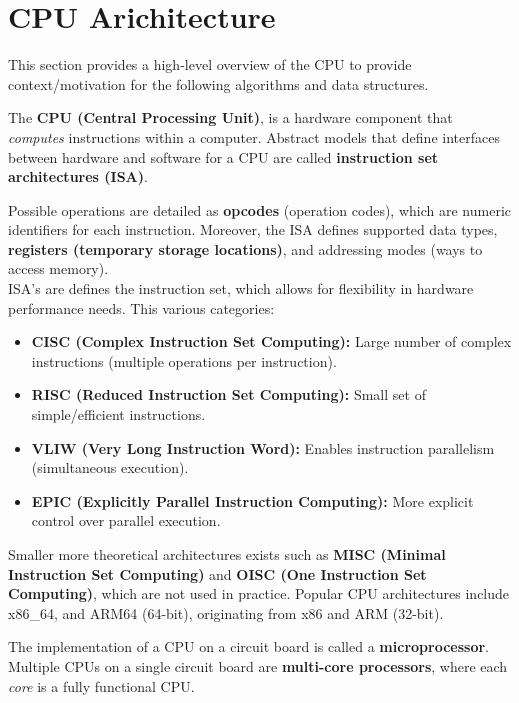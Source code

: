 \section{CPU Arichitecture}
\label{sec:cpu_memory}

\noindent
This section provides a high-level overview of the CPU to provide context/motivation for the following algorithms and data structures.

\begin{Def}

    The \textbf{CPU (Central Processing Unit)}, is a hardware component that \emph{computes} instructions within a computer.
    Abstract models that define interfaces between hardware and software for a CPU are called \textbf{instruction set architectures (ISA)}.
    
    Possible operations are detailed as \textbf{opcodes} (operation codes), which are numeric identifiers for each instruction. 
    Moreover, the ISA defines supported data types, \textbf{registers (temporary storage locations)}, and addressing modes (ways to access memory).\\

    \noindent
    ISA's are defines the instruction set, which allows for flexibility in hardware performance needs. This various categories:
    \begin{itemize}
        \item \textbf{CISC (Complex Instruction Set Computing):} Large number of complex instructions (multiple operations per instruction).
        \item \textbf{RISC (Reduced Instruction Set Computing):} Small set of simple/efficient instructions.
        \item \textbf{VLIW (Very Long Instruction Word):} Enables instruction parallelism (simultaneous execution).
        \item \textbf{EPIC (Explicitly Parallel Instruction Computing):} More explicit control over parallel execution.
    \end{itemize}
    \noindent
    Smaller more theoretical architectures exists such as \textbf{MISC (Minimal Instruction Set Computing)} and \textbf{OISC (One Instruction Set Computing)}, which are not used in practice.
    Popular CPU architectures include x86\_64, and ARM64 (64-bit), originating from x86 and ARM (32-bit). 
    
    The implementation of a CPU on a circuit board is called a \textbf{microprocessor}. Multiple CPUs on a single circuit board are \textbf{multi-core processors}, where each \emph{core}
    is a fully functional CPU.
\end{Def}

